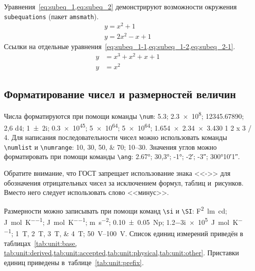 Уравнения~\cref{eq:subeq_1,eq:subeq_2} демонстрируют возможности
окружения \verb|subequations| (пакет \verb|amsmath|).
\begin{subequations}
    \label{eq:subeq_1}
    \begin{gather}
        y = x^2 + 1 \label{eq:subeq_1-1} \\
        y = 2 x^2 - x + 1 \label{eq:subeq_1-2}
    \end{gather}
\end{subequations}
Ссылки на отдельные уравнения~\cref{eq:subeq_1-1,eq:subeq_1-2,eq:subeq_2-1}.
\begin{subequations}
    \label{eq:subeq_2}
    \begin{align}
        y & = x^3 + x^2 + x + 1 \label{eq:subeq_2-1} \\
        y & = x^2
    \end{align}
\end{subequations}

\subsection{Форматирование чисел и размерностей величин}\label{sec:units}

Числа форматируются при помощи команды \verb|\num|:
\num{5,3};
\num{2,3e8};
\num{12345,67890};
\num{2,6 d4};
\num{1+-2i};
\num{.3e45};
\num[exponent-base=2]{5 e64};
\num[exponent-base=2,exponent-to-prefix]{5 e64};
\num{1.654 x 2.34 x 3.430}
\num{1 2 x 3 / 4}.
Для написания последовательности чисел можно использовать команды \verb|\numlist| и \verb|\numrange|:
\numlist{10;30;50;70}; \numrange{10}{30}.
Значения углов можно форматировать при помощи команды \verb|\ang|:
\ang{2.67};
\ang{30,3};
\ang{-1;;};
\ang{;-2;};
\ang{;;-3};
\ang{300;10;1}.

Обратите внимание, что ГОСТ запрещает использование знака <<->> для обозначения отрицательных чисел
за исключением формул, таблиц и~рисунков.
Вместо него следует использовать слово <<минус>>.

Размерности можно записывать при помощи команд \verb|\si| и \verb|\SI|:
\si{\farad\squared\lumen\candela};
\si{\joule\per\mole\per\kelvin};
\si[per-mode = symbol-or-fraction]{\joule\per\mole\per\kelvin};
\si{\metre\per\second\squared};
\SI{0.10(5)}{\neper};
\SI{1.2-3i e5}{\joule\per\mole\per\kelvin};
\SIlist{1;2;3;4}{\tesla};
\SIrange{50}{100}{\volt}.
Список единиц измерений приведён в таблицах~\cref{tab:unit:base,
    tab:unit:derived,tab:unit:accepted,tab:unit:physical,tab:unit:other}.
Приставки единиц приведены в~таблице~\cref{tab:unit:prefix}.

